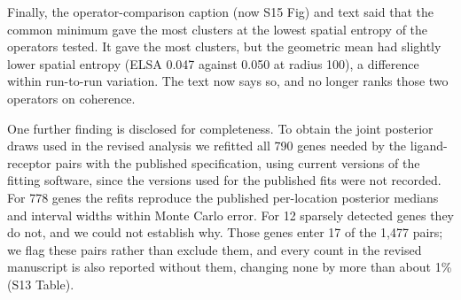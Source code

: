 \documentclass[11pt]{article}
\begin{document}
Finally, the operator-comparison caption (now S15 Fig) and text said that the common minimum gave the most clusters at
the lowest spatial entropy of the operators tested. It gave the most clusters, but the
geometric mean had slightly lower spatial entropy (ELSA 0.047 against 0.050 at radius 100), a
difference within run-to-run variation. The text now says so, and no longer ranks those two
operators on coherence.

One further finding is disclosed for completeness. To obtain the joint posterior draws used in the
revised analysis we refitted all 790 genes needed by the ligand-receptor pairs with the published
specification, using current versions of the fitting software, since the versions used for the
published fits were not recorded. For 778 genes the refits reproduce the published per-location
posterior medians and interval widths within Monte Carlo error. For 12 sparsely detected genes they
do not, and we could not establish why. Those genes enter 17 of the 1,477 pairs; we flag these pairs
rather than exclude them, and every count in the revised manuscript is also reported without them,
changing none by more than about 1\% (S13 Table).
\end{document}
